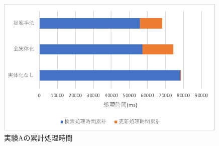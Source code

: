 \documentclass[a4paper,11pt]{ujreport}
\begin{document}
\begin{figure}[htbp]
	\begin{center}
		\includegraphics[width=30em]{src/ExperimentA-total.pdf} %
	\end{center}
	\caption{実験Aの累計処理時間}
	\label{ExperimentA-total}
\end{figure}
\end{document}
